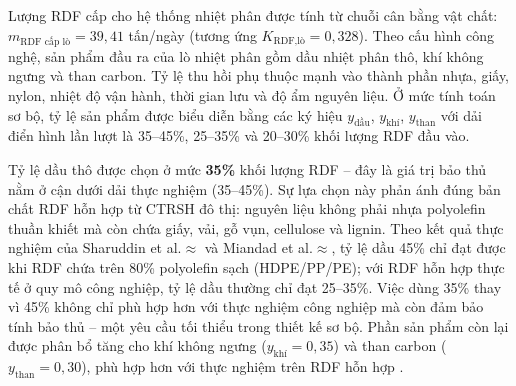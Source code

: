 \documentclass[../main.tex]{subfiles}
\begin{document}
Lượng RDF cấp cho hệ thống nhiệt phân được tính từ chuỗi cân bằng vật chất: $m_{\text{RDF cấp lò}} = 39{,}41$ tấn/ngày (tương ứng $K_{\text{RDF,lò}} = 0{,}328$). Theo cấu hình công nghệ, sản phẩm đầu ra của lò nhiệt phân gồm dầu nhiệt phân thô, khí không ngưng và than carbon. Tỷ lệ thu hồi phụ thuộc mạnh vào thành phần nhựa, giấy, nylon, nhiệt độ vận hành, thời gian lưu và độ ẩm nguyên liệu. Ở mức tính toán sơ bộ, tỷ lệ sản phẩm được biểu diễn bằng các ký hiệu $y_{\text{dầu}}$, $y_{\text{khí}}$, $y_{\text{than}}$ với dải điển hình lần lượt là 35--45\%, 25--35\% và 20--30\% khối lượng RDF đầu vào.

Tỷ lệ dầu thô được chọn ở mức \textbf{35\%} khối lượng RDF -- đây là giá trị bảo thủ nằm ở cận dưới dải thực nghiệm (35--45\%). Sự lựa chọn này phản ánh đúng bản chất RDF hỗn hợp từ CTRSH đô thị: nguyên liệu không phải nhựa polyolefin thuần khiết mà còn chứa giấy, vải, gỗ vụn, cellulose và lignin. Theo kết quả thực nghiệm của Sharuddin et al.$\approx$\cite{Sharuddin2016} và Miandad et al.$\approx$\cite{Miandad2016}, tỷ lệ dầu 45\% chỉ đạt được khi RDF chứa trên 80\% polyolefin sạch (HDPE/PP/PE); với RDF hỗn hợp thực tế ở quy mô công nghiệp, tỷ lệ dầu thường chỉ đạt 25--35\%. Việc dùng 35\% thay vì 45\% không chỉ phù hợp hơn với thực nghiệm công nghiệp mà còn đảm bảo tính bảo thủ -- một yêu cầu tối thiểu trong thiết kế sơ bộ. Phần sản phẩm còn lại được phân bổ tăng cho khí không ngưng ($y_{\text{khí}} = 0{,}35$) và than carbon ($y_{\text{than}} = 0{,}30$), phù hợp hơn với thực nghiệm trên RDF hỗn hợp \cite{Williams2007}.



\begin{table}[htbp]
\caption{Cân bằng sản phẩm của lò nhiệt phân}
\label{tab:can-bang-nhiet-phan-tong-quat}
\centering
\setlength{\tabcolsep}{5pt}
\end{table}
\end{document}
